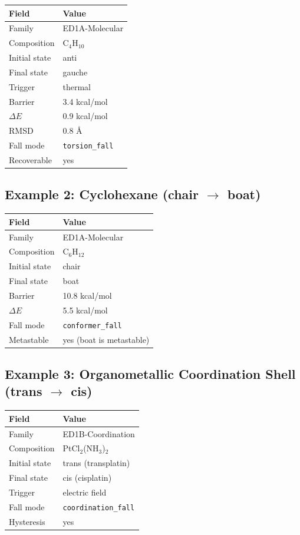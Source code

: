 \documentclass[11pt]{article}
\begin{document}
\begin{center}
\begin{tabular}{lp{9cm}}
\toprule
\textbf{Field} & \textbf{Value} \\
\midrule
Family & ED1A-Molecular \\
Composition & C$_4$H$_{10}$ \\
Initial state & anti \\
Final state & gauche \\
Trigger & thermal \\
Barrier & 3.4 kcal/mol \\
$\Delta E$ & 0.9 kcal/mol \\
RMSD & 0.8 \AA \\
Fall mode & \texttt{torsion\_fall} \\
Recoverable & yes \\
\bottomrule
\end{tabular}
\end{center}

\subsection{Example 2: Cyclohexane (chair $\to$ boat)}

\begin{center}
\begin{tabular}{lp{9cm}}
\toprule
\textbf{Field} & \textbf{Value} \\
\midrule
Family & ED1A-Molecular \\
Composition & C$_6$H$_{12}$ \\
Initial state & chair \\
Final state & boat \\
Barrier & 10.8 kcal/mol \\
$\Delta E$ & 5.5 kcal/mol \\
Fall mode & \texttt{conformer\_fall} \\
Metastable & yes (boat is metastable) \\
\bottomrule
\end{tabular}
\end{center}

\subsection{Example 3: Organometallic Coordination Shell (trans $\to$ cis)}

\begin{center}
\begin{tabular}{lp{9cm}}
\toprule
\textbf{Field} & \textbf{Value} \\
\midrule
Family & ED1B-Coordination \\
Composition & PtCl$_2$(NH$_3$)$_2$ \\
Initial state & trans (transplatin) \\
Final state & cis (cisplatin) \\
Trigger & electric field \\
Fall mode & \texttt{coordination\_fall} \\
Hysteresis & yes \\
\bottomrule
\end{tabular}
\end{center}
\end{document}
